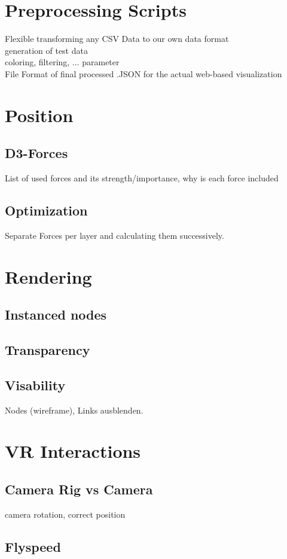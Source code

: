 \section{Preprocessing Scripts}

Flexible transforming any CSV Data to our own data format \\
generation of test data \\
coloring, filtering, ... parameter \\
File Format of final processed .JSON for the actual web-based visualization \\

\section{Position}
\subsection{D3-Forces}
List of used forces and its strength/importance, why is each force included
\subsection{Optimization}
Separate Forces per layer and calculating them successively.

\section{Rendering}
\subsection{Instanced nodes}
\subsection{Transparency}
\subsection{Visability}
Nodes (wireframe), Links ausblenden.

\section{VR Interactions}
\subsection{Camera Rig vs Camera}
camera rotation, correct position 
\subsection{Flyspeed}
